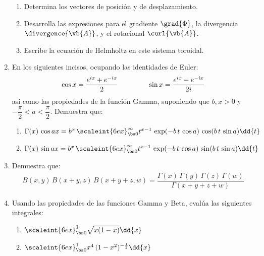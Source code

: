 \begin{enumerate}
\begin{enumerate}[label=\alph*)]
\item Determina los vectores de posición y de desplazamiento.
\item Desarrolla las expresiones para el gradiente $\grad{\Phi}$, la divergencia \hfill \break $\divergence{\vb{A}}$, y el rotacional $\curl{\vb{A}}$.
\item Escribe la ecuación de Helmholtz en este sistema toroidal.
\end{enumerate}
\item En los siguientes incisos, ocupando las identidades de Euler:
\begin{align*}
\cos x = \dfrac{e^{i x} + e^{-i x}}{2} \hspace{1.5cm} \sin x = \dfrac{e^{i x} - e^{-i x}}{2 i}
\end{align*}
así como las propiedades de la función Gamma, suponiendo que $b, x > 0$ y $-\dfrac{\pi}{2} < a < \dfrac{\pi}{2}$. Demuestra que:
\begin{enumerate}[label=\alph*)]
\item $\Gamma (x) \, \cos a x = b^{x} \, \scaleint{6ex}_{\bs 0}^{\infty} t^{x-1} \, \exp(- b \, t \, \cos a) \, \cos (b \, t \, \sin a) \dd{t}$
\item $\Gamma (x) \, \sin a x = b^{x} \, \scaleint{6ex}_{\bs 0}^{\infty} t^{x-1} \, \exp(- b \, t \, \cos a) \, \sin (b \, t \, \sin a) \dd{t}$
\end{enumerate}
\item Demuestra que:
\begin{align*}
B(x, y) \, B(x + y, z) \, B(x + y + z, w) = \dfrac{\Gamma(x) \, \Gamma (y) \, \Gamma (z) \, \Gamma (w)}{\Gamma (x + y + z + w)}
\end{align*}
\item Usando las propiedades de las funciones Gamma y Beta, evalúa las siguientes integrales:
\begin{enumerate}[label=\alph*)]
\item $\scaleint{6ex}_{\bs 0}^{1} \sqrt{x (1 - x)} \dd{x}$
\item $\scaleint{6ex}_{\bs 0}^{1} x^{4} \, (1 - x^{2})^{-\frac{1}{2}} \dd{x}$
\end{enumerate}
\end{enumerate}

